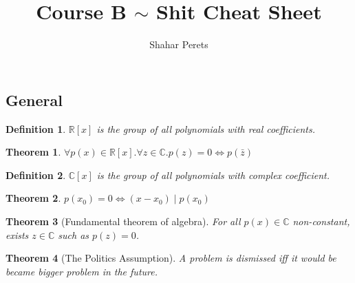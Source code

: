 \documentclass[]{article}
\author{Shahar Perets}
\title{Course B $\sim$ Shit Cheat Sheet}
\newtheorem{theorem}{Theorem}[section]
\newtheorem{definition}{Definition}[section]
\newcommand\R     {\mathbb{R}}
\newcommand\C     {\mathbb{C}}
\begin{document}
	\begin{multicols}{2}
		
		
		\section{General}
		
		\begin{definition}
			$\R[x]$ is the group of all polynomials with real coefficients. 
		\end{definition}
		
		\begin{theorem}
			$\forall p(x) \in \R[x]. \forall z \in \C. p(z) = 0 \iff p(\bar z)$
		\end{theorem}
		
		\begin{definition}
			$\C[x]$ is the group of all polynomials with complex coefficient. 
		\end{definition}
		
		\begin{theorem}
			$p(x_0) = 0 \iff (x - x_0) \mid p(x_0)$
		\end{theorem}
		
		\begin{theorem}[Fundamental theorem of algebra]
			For all $p(x) \in \C$ non-constant, exists $z \in \C$ such as $p(z) = 0$. 
		\end{theorem}
		
		\begin{theorem}[The Politics Assumption]
			A problem is dismissed iff it would be became bigger problem in the future. 
		\end{theorem}
		

\end{multicols}
\end{document}
